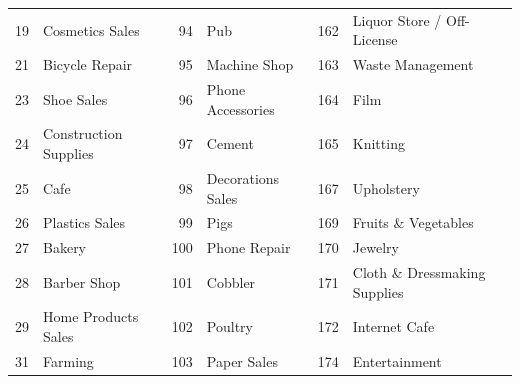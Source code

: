 \begin{longtable}[]{|r|l|r|l|r|l|}
    19                                & Cosmetics Sales                    & 94                                & Pub                                & 162                               & Liquor Store / Off-License         \\
    21                                & Bicycle Repair                     & 95                                & Machine Shop                       & 163                               & Waste Management                   \\
    23                                & Shoe Sales                         & 96                                & Phone Accessories                  & 164                               & Film                               \\
    24                                & Construction Supplies              & 97                                & Cement                             & 165                               & Knitting                           \\
    25                                & Cafe                               & 98                                & Decorations Sales                  & 167                               & Upholstery                         \\
    26                                & Plastics Sales                     & 99                                & Pigs                               & 169                               & Fruits \& Vegetables               \\
    27                                & Bakery                             & 100                               & Phone Repair                       & 170                               & Jewelry                            \\
    28                                & Barber Shop                        & 101                               & Cobbler                            & 171                               & Cloth \& Dressmaking
    Supplies                                                                                                                                                                                                                 \\
    29                                & Home Products Sales                & 102                               & Poultry                            & 172                               & Internet Cafe                      \\
    31                                & Farming                            & 103                               & Paper Sales                        & 174                               & Entertainment                      \\

\end{longtable}
